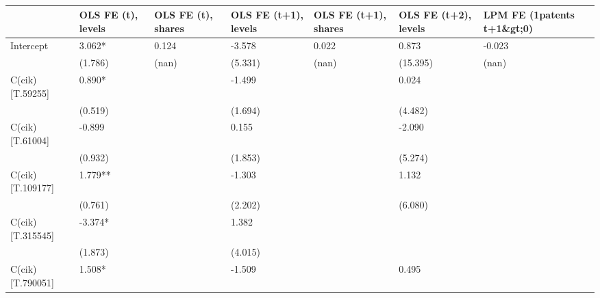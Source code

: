 \begin{table}
\caption{}
\label{}
\begin{center}
\begin{tabular}{lllllll}
\hline
                  & OLS FE (t), levels & OLS FE (t), shares & OLS FE (t+1), levels & OLS FE (t+1), shares & OLS FE (t+2), levels & LPM FE (1{patents t+1\&gt;0})  \\
\hline
Intercept         & 3.062*             & 0.124              & -3.578               & 0.022                & 0.873                & -0.023                         \\
                  & (1.786)            & (nan)              & (5.331)              & (nan)                & (15.395)             & (nan)                          \\
C(cik)[T.59255]   & 0.890*             &                    & -1.499               &                      & 0.024                &                                \\
                  & (0.519)            &                    & (1.694)              &                      & (4.482)              &                                \\
C(cik)[T.61004]   & -0.899             &                    & 0.155                &                      & -2.090               &                                \\
                  & (0.932)            &                    & (1.853)              &                      & (5.274)              &                                \\
C(cik)[T.109177]  & 1.779**            &                    & -1.303               &                      & 1.132                &                                \\
                  & (0.761)            &                    & (2.202)              &                      & (6.080)              &                                \\
C(cik)[T.315545]  & -3.374*            &                    & 1.382                &                      &                      &                                \\
                  & (1.873)            &                    & (4.015)              &                      &                      &                                \\
C(cik)[T.790051]  & 1.508*             &                    & -1.509               &                      & 0.495                &                                \\

\end{tabular}
\end{center}
\end{table}

